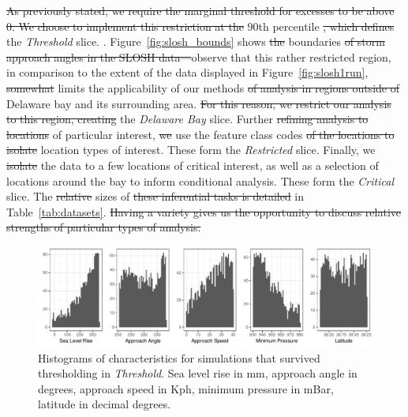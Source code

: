 \st{As previously stated, we require the marginal threshold for excesses to be above 0.  We choose
    to implement this restriction at the}  90th percentile \st{, which defines}  the 
    \emph{Threshold} slice.
    .  
    Figure~\ref{fig:slosh_bounds} shows \st{the}  boundaries \st{of  storm approach angles in the SLOSH data---}observe that this 
     rather restricted region, 
    in comparison to the extent of the data displayed in Figure~\ref{fig:slosh1run},
    \st{somewhat}  limits the applicability of our methods \st{of analysis in regions outside
    of}  Delaware bay and its surrounding area.  \st{For this 
    reason, we restrict our analysis to this region, creating} the \emph{Delaware Bay} slice.  Further 
    \st{refining analysis to locations}   of particular interest, \st{we}  use the feature class 
    codes \st{of the locations to isolate}  location types
     of interest.  These form the \emph{Restricted} slice.
    Finally, we \st{isolate}  the data to a few locations of critical interest, 
    as well as a selection of locations around the bay to inform conditional analysis.  These 
    form the \emph{Critical} slice. The \st{relative} sizes of \st{these inferential tasks is detailed}
    in Table~\ref{tab:datasets}.  \st{Having
    a variety gives us the opportunity to discuss relative strengths of particular types of analysis.}

\begin{figure}[htb]
    \centering 
    \caption{Histograms of characteristics for simulations that survived thresholding in \emph{Threshold}.
        Sea level rise in mm, approach angle in degrees, approach speed in Kph, minimum pressure in mBar,
        latitude in decimal degrees. 
        \label{fig:thetahistogram}}
    \includegraphics[width=0.9\linewidth]{plots/threshold_histogram}
\end{figure}

